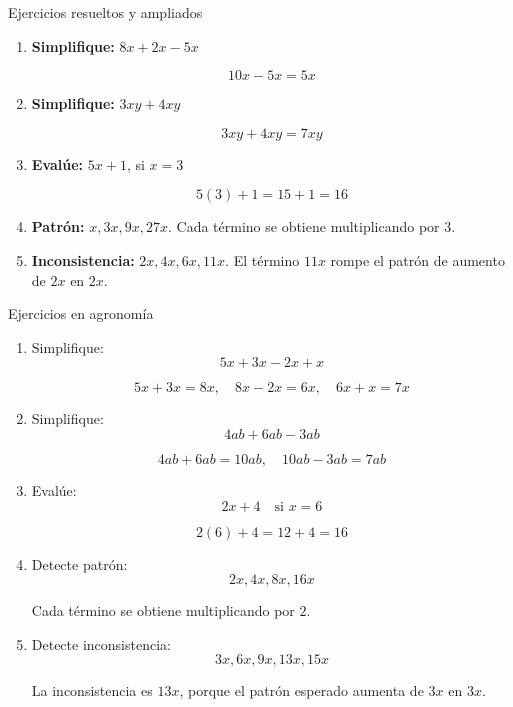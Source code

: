\documentclass[handout,aspectratio=169,12pt]{beamer}
\begin{document}
	\begin{frame}{Ejercicios resueltos y ampliados}
		\small
		\begin{enumerate}
			\item \textbf{Simplifique:} \(8x+2x-5x\)
			
			\pause
			\[
			10x-5x=5x
			\]
			
			\pause
			\item \textbf{Simplifique:} \(3xy+4xy\)
			
			\pause
			\[
			3xy+4xy=7xy
			\]
			
			\pause
			\item \textbf{Evalúe:} \(5x+1\), si \(x=3\)
			
			\pause
			\[
			5(3)+1=15+1=16
			\]
			
			\pause
			\item \textbf{Patrón:} \(x,3x,9x,27x\). \pause Cada término se obtiene multiplicando por \(3\).
			
			\pause
			\item \textbf{Inconsistencia:} \(2x,4x,6x,11x\). \pause
			El término \(11x\) rompe el patrón de aumento de \(2x\) en \(2x\).
		\end{enumerate}
	\end{frame}
	
	\begin{frame}{Ejercicios en agronomía}
		\small
		\begin{enumerate}
			\item Simplifique:
			\[
			5x+3x-2x+x
			\]
			
			\pause
			\[
			5x+3x=8x,\quad 8x-2x=6x,\quad 6x+x=7x
			\]
			
			\pause
			\item Simplifique:
			\[
			4ab+6ab-3ab
			\]
			
			\pause
			\[
			4ab+6ab=10ab,\quad 10ab-3ab=7ab
			\]
			
			\pause
			\item Evalúe:
			\[
			2x+4 \quad \text{si } x=6
			\]
			
			\pause
			\[
			2(6)+4=12+4=16
			\]
			
			\pause
			\item Detecte patrón:
			\[
			2x,4x,8x,16x
			\]
			
			\pause
			Cada término se obtiene multiplicando por \(2\).
			
			\pause
			\item Detecte inconsistencia:
			\[
			3x,6x,9x,13x,15x
			\]
			
			\pause
			La inconsistencia es \(13x\), porque el patrón esperado aumenta de \(3x\) en \(3x\).
		\end{enumerate}
	\end{frame}
	
\end{document}
